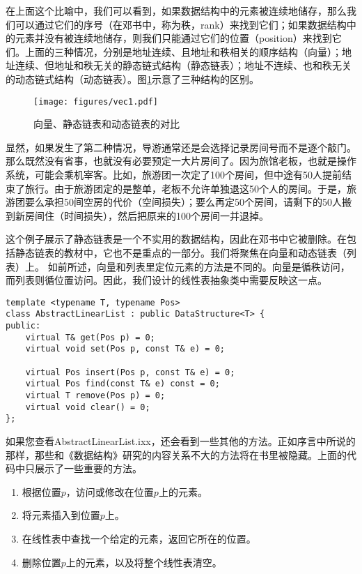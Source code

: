 在上面这个比喻中，我们可以看到，如果数据结构中的元素被连续地储存，那么我们可以通过它们的序号（在邓书中，称为秩，rank）来找到它们；如果数据结构中的元素并没有被连续地储存，则我们只能通过它们的位置（position）来找到它们。上面的三种情况，分别是地址连续、且地址和秩相关的顺序结构（向量）；地址连续、但地址和秩无关的静态链式结构（静态链表）；地址不连续、也和秩无关的动态链式结构（动态链表）。图\ref{fig:vec1}示意了三种结构的区别。

\begin{figure}
  \centering
  \texttt{[image: figures/vec1.pdf]}
  \caption{向量、静态链表和动态链表的对比}
  \label{fig:vec1}
\end{figure}

显然，如果发生了第二种情况，导游通常还是会选择记录房间号而不是逐个敲门。那么既然没有省事，也就没有必要预定一大片房间了。因为旅馆老板，也就是操作系统，可能会乘机宰客。比如，旅游团一次定了100个房间，但中途有50人提前结束了旅行。由于旅游团定的是整单，老板不允许单独退这50个人的房间。于是，旅游团要么承担50间空房的代价（空间损失）；要么再定50个房间，请剩下的50人搬到新房间住（时间损失），然后把原来的100个房间一并退掉。

这个例子展示了静态链表是一个不实用的数据结构，因此在邓书中它被删除。在包括静态链表的教材中，它也不是重点的一部分。我们将聚焦在向量和动态链表（列表）上。
如前所述，向量和列表里定位元素的方法是不同的。向量是循秩访问，而列表则循位置访问。因此，我们设计的线性表抽象类中需要反映这一点。

\begin{lstlisting}
template <typename T, typename Pos>
class AbstractLinearList : public DataStructure<T> {
public:
    virtual T& get(Pos p) = 0;
    virtual void set(Pos p, const T& e) = 0;

    virtual Pos insert(Pos p, const T& e) = 0;
    virtual Pos find(const T& e) const = 0;
    virtual T remove(Pos p) = 0;
    virtual void clear() = 0;
};
\end{lstlisting}

如果您查看AbstractLinearList.ixx，还会看到一些其他的方法。正如序言中所说的那样，那些和《数据结构》研究的内容关系不大的方法将在书里被隐藏。上面的代码中只展示了一些重要的方法。

\begin{enumerate}
    \item 根据位置$p$，访问或修改在位置$p$上的元素。
    \item 将元素插入到位置$p$上。
    \item 在线性表中查找一个给定的元素，返回它所在的位置。
    \item 删除位置$p$上的元素，以及将整个线性表清空。
\end{enumerate}

